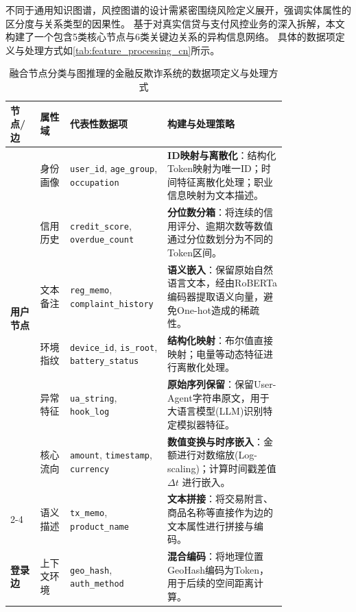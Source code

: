 不同于通用知识图谱，风控图谱的设计需紧密围绕风险定义展开，强调实体属性的区分度与关系类型的因果性。
基于对真实信贷与支付风控业务的深入拆解，本文构建了一个包含5类核心节点与6类关键边关系的异构信息网络。
具体的数据项定义与处理方式如\autoref{tab:feature_processing_cn}所示。


\begin{table}[h]
\centering
\small 
\caption{融合节点分类与图推理的金融反欺诈系统的数据项定义与处理方式}
\label{tab:feature_processing_cn}
\renewcommand{\arraystretch}{1} %
\begin{tabular}{p{0.1\linewidth} p{0.1\linewidth} p{0.2\linewidth} p{0.4\linewidth}}
\toprule
\textbf{节点/边} & \textbf{属性域} & \textbf{代表性数据项} & \textbf{构建与处理策略} \\
\midrule

\multirow{6}{*}{\textbf{用户节点}} 
& 身份画像 & \texttt{user\_id}, \texttt{age\_group}, \texttt{occupation} & \textbf{ID映射与离散化}：结构化Token映射为唯一ID；时间特征离散化处理；职业信息映射为文本描述。 \\
\cmidrule(l){2-4}
& 信用历史 & \texttt{credit\_score}, \texttt{overdue\_count} & \textbf{分位数分箱}：将连续的信用评分、逾期次数等数值通过分位数划分为不同的Token区间。 \\
\cmidrule(l){2-4}
& 文本备注 & \texttt{reg\_memo}, \texttt{complaint\_history} & \textbf{语义嵌入}：保留原始自然语言文本，经由RoBERTa编码器提取语义向量，避免One-hot造成的稀疏性。 \\
\midrule

\multirow{3}{*}{\textbf{设备节点}} 
& 环境指纹 & \texttt{device\_id}, \texttt{is\_root}, \texttt{battery\_status} & \textbf{结构化映射}：布尔值直接映射；电量等动态特征进行离散化处理。 \\
\cmidrule(l){2-4}
& 异常特征 & \texttt{ua\_string}, \texttt{hook\_log} & \textbf{原始序列保留}：保留User-Agent字符串原文，用于大语言模型(LLM)识别特定模拟器特征。 \\
\midrule

\multirow{3}{*}{\textbf{交易边}} 
& 核心流向 & \texttt{amount}, \texttt{timestamp}, \texttt{currency} & \textbf{数值变换与时序嵌入}：金额进行对数缩放(Log-scaling)；计算时间戳差值 $\Delta t$ 进行嵌入。 \\
\cmidrule(l){2-4}
& 语义描述 & \texttt{tx\_memo}, \texttt{product\_name} & \textbf{文本拼接}：将交易附言、商品名称等直接作为边的文本属性进行拼接与编码。 \\
\midrule

\textbf{登录边} 
& 上下文环境 & \texttt{geo\_hash}, \texttt{auth\_method} & \textbf{混合编码}：将地理位置GeoHash编码为Token，用于后续的空间距离计算。 \\

\bottomrule
\end{tabular}
\end{table}

